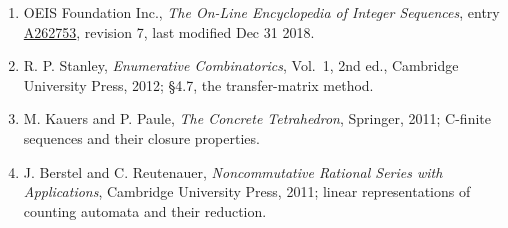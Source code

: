 \documentclass[11pt]{article}
\theoremstyle{definition}
\begin{document}
\begin{enumerate}

\item OEIS Foundation Inc., \emph{The On-Line Encyclopedia of Integer Sequences}, entry \href{https://oeis.org/A262753}{A262753}, revision 7, last modified Dec 31 2018.

\item R. P. Stanley, \emph{Enumerative Combinatorics}, Vol.~1, 2nd ed., Cambridge University Press, 2012; \S4.7, the transfer-matrix method.

\item M. Kauers and P. Paule, \emph{The Concrete Tetrahedron}, Springer, 2011; C-finite sequences and their closure properties.

\item J. Berstel and C. Reutenauer, \emph{Noncommutative Rational Series with Applications}, Cambridge University Press, 2011; linear representations of counting automata and their reduction.

\end{enumerate}
\end{document}
